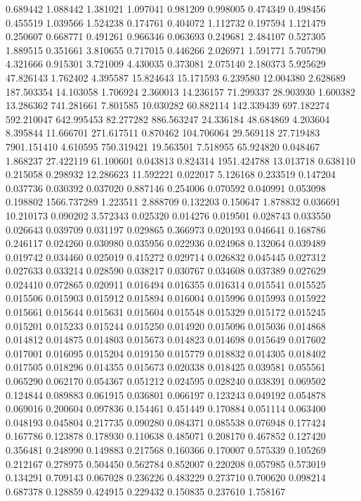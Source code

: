 0.689442
1.088442
1.381021
1.097041
0.981209
0.998005
0.474349
0.498456
0.455519
1.039566
1.524238
0.174761
0.404072
1.112732
0.197594
1.121479
0.250607
0.668771
0.491261
0.966346
0.063693
0.249681
2.484107
0.527305
1.889515
0.351661
3.810655
0.717015
0.446266
2.026971
1.591771
5.705790
4.321666
0.915301
3.721009
4.430035
0.373081
2.075140
2.180373
5.925629
47.826143
1.762402
4.395587
15.824643
15.171593
6.239580
12.004380
2.628689
187.503354
14.103058
1.706924
2.360013
14.236157
71.299337
28.903930
1.600382
13.286362
741.281661
7.801585
10.030282
60.882114
142.339439
697.182274
592.210047
642.995453
82.277282
886.563247
24.336184
48.684869
4.203604
8.395844
11.666701
271.617511
0.870462
104.706064
29.569118
27.719483
7901.151410
4.610595
750.319421
19.563501
7.518955
65.924820
0.048467
1.868237
27.422119
61.100601
0.043813
0.824314
1951.424788
13.013718
0.638110
0.215058
0.298932
12.286623
11.592221
0.022017
5.126168
0.233519
0.147204
0.037736
0.030392
0.037020
0.887146
0.254006
0.070592
0.040991
0.053098
0.198802
1566.737289
1.223511
2.888709
0.132203
0.150647
1.878832
0.036691
10.210173
0.090202
3.572343
0.025320
0.014276
0.019501
0.028743
0.033550
0.026643
0.039709
0.031197
0.029865
0.366973
0.020193
0.046641
0.168786
0.246117
0.024260
0.030980
0.035956
0.022936
0.024968
0.132064
0.039489
0.019742
0.034460
0.025019
0.415272
0.029714
0.026832
0.045445
0.027312
0.027633
0.033214
0.028590
0.038217
0.030767
0.034608
0.037389
0.027629
0.024410
0.072865
0.020911
0.016494
0.016355
0.016314
0.015541
0.015525
0.015506
0.015903
0.015912
0.015894
0.016004
0.015996
0.015993
0.015922
0.015661
0.015644
0.015631
0.015604
0.015548
0.015329
0.015172
0.015245
0.015201
0.015233
0.015244
0.015250
0.014920
0.015096
0.015036
0.014868
0.014812
0.014875
0.014803
0.015673
0.014823
0.014698
0.015649
0.017602
0.017001
0.016095
0.015204
0.019150
0.015779
0.018832
0.014305
0.018402
0.017505
0.018296
0.014355
0.015673
0.020338
0.018425
0.039581
0.055561
0.065290
0.062170
0.054367
0.051212
0.024595
0.028240
0.038391
0.069502
0.124844
0.089883
0.061915
0.036801
0.066197
0.123243
0.049192
0.054878
0.069016
0.200604
0.097836
0.154461
0.451449
0.170884
0.051114
0.063400
0.048193
0.045804
0.217735
0.090280
0.084371
0.085538
0.076948
0.177424
0.167786
0.123878
0.178930
0.110638
0.485071
0.208170
0.467852
0.127420
0.356481
0.248990
0.149883
0.217568
0.160366
0.170007
0.575339
0.105269
0.212167
0.278975
0.504450
0.562784
0.852007
0.220208
0.057985
0.573019
0.134291
0.709143
0.067028
0.236226
0.483229
0.273710
0.700620
0.098214
0.687378
0.128859
0.424915
0.229432
0.150835
0.237610
1.758167

